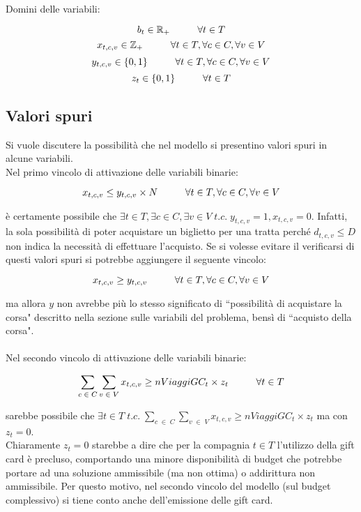 \documentclass[main.tex]{subfiles}
\begin{document}
Domini delle variabili:
\begin{tcolorbox}
$$b_t \in \mathbb{R}_+ \hspace{10mm} \forall{} t \in T$$
$$x_{t,c,v} \in \mathbb{Z}_+ \hspace{10mm} \forall{} t \in T, \forall{} c \in C, \forall{} v \in V$$
$$y_{t,c,v} \in \{0,1\} \hspace{10mm} \forall{} t \in T, \forall{} c \in C, \forall{} v \in V$$
$$z_t \in \{0,1\} \hspace{10mm} \forall{} t \in T$$
\end{tcolorbox}

\subsection{Valori spuri}
Si vuole discutere la possibilità che nel modello si presentino valori spuri in alcune variabili.\\
Nel primo vincolo di attivazione delle variabili binarie:
\begin{tcolorbox}
    $$x_{t,c,v} \leq y_{t,c,v} \times{} N \hspace{10mm} \forall{} t \in T, \forall{} c \in C, \forall{} v \in V$$
\end{tcolorbox}
è certamente possibile che $\exists{} t \in T, \exists{} c \in C, \exists{} v \in V\; t.c.\; y_{t,c,v} = 1, x_{t,c,v} = 0$.
Infatti, la sola possibilità di poter acquistare un biglietto per una tratta perché $d_{t,c,v} \leq D$ non indica la necessità di effettuare l'acquisto.
Se si volesse evitare il verificarsi di questi valori spuri si potrebbe aggiungere il seguente vincolo:
\begin{tcolorbox}
    $$x_{t,c,v} \geq y_{t,c,v} \hspace{10mm} \forall{} t \in T, \forall{} c \in C, \forall{} v \in V$$
\end{tcolorbox}
ma allora $y$ non avrebbe più lo stesso significato di ``possibilità di acquistare la corsa" descritto nella sezione sulle variabili del problema, bensì di ``acquisto della corsa".\\ \\
Nel secondo vincolo di attivazione delle variabili binarie:
\begin{tcolorbox}
    $$\sum_{c\; \in\; C} \sum_{v\; \in\; V} x_{t,c,v} \geq nViaggiGC_t \times z_t \hspace{10mm} \forall{} t \in T$$
\end{tcolorbox}
sarebbe possibile che $\exists{} t \in T\; t.c.\; \sum_{c\; \in\; C} \sum_{v\; \in\; V} x_{t,c,v} \geq nViaggiGC_t \times z_t$ ma con $z_t = 0$.\\
Chiaramente $z_t = 0$ starebbe a dire che per la compagnia $t \in T$ l'utilizzo della gift card è precluso, comportando una minore disponibilità di budget che potrebbe
portare ad una soluzione ammissibile (ma non ottima) o addirittura non ammissibile. Per questo motivo, nel secondo vincolo del modello (sul budget complessivo) si tiene conto anche dell'emissione
delle gift card.
\end{document}
